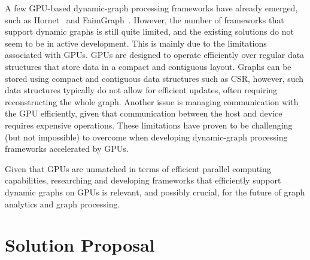 A few \gls{GPU}-based dynamic-graph processing frameworks have already emerged, such as Hornet~\cite{paper:hornet} and FaimGraph~\cite{paper:faimgraph}. However, the number of frameworks that support dynamic graphs is still quite limited, and the existing solutions do not seem to be in active development. This is mainly due to the limitations associated with \gls{GPU}s. \gls{GPU}s are designed to operate efficiently over regular data structures that store data in a compact and contiguous layout. Graphs can be stored using compact and contiguous data structures such as \gls{CSR}, however, such data structures typically do not allow for efficient updates, often requiring reconstructing the whole graph. Another issue is managing communication with the \gls{GPU} efficiently, given that communication between the host and device requires expensive operations. These limitations have proven to be challenging (but not impossible) to overcome when developing dynamic-graph processing frameworks accelerated by \gls{GPU}s.

Given that \gls{GPU}s are unmatched in terms of efficient parallel computing capabilities, researching and developing frameworks that efficiently support dynamic graphs on \gls{GPU}s is relevant, and possibly crucial, for the future of graph analytics and graph processing. 



\section{Solution Proposal}

